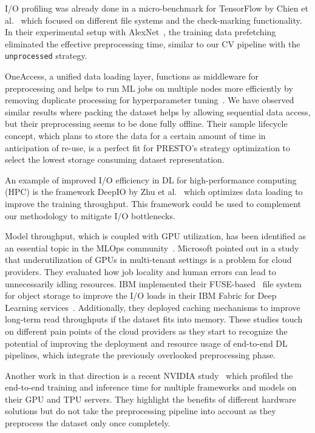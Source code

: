 I/O profiling was already done in a micro-benchmark for TensorFlow by Chien et al.~\cite{Chien_2018} which focused on different file systems and the check-marking functionality.
In their experimental setup with AlexNet~\cite{krizhevsky2012imagenet}, the training data prefetching eliminated the effective preprocessing time, similar to our CV pipeline with the \texttt{unprocessed} strategy.

OneAccess, a unified data loading layer, functions as middleware for preprocessing and helps to run ML jobs on multiple nodes more efficiently by removing duplicate processing for hyperparameter tuning~\cite{kakaraparthy2019case}.
We have observed similar results where packing the dataset helps by allowing sequential data access, but their preprocessing seems to be done fully offline.
Their sample lifecycle concept, which plans to store the data for a certain amount of time in anticipation of re-use, is a perfect fit for PRESTO's strategy optimization to select the lowest storage consuming dataset representation.

An example of improved I/O efficiency in DL for high-performance computing (HPC) is the framework DeepIO by Zhu et al.~\cite{zhu2018entropy} which optimizes data loading to improve the training throughput.
This framework could be used to complement our methodology to mitigate I/O bottlenecks.

Model throughput, which is coupled with GPU utilization, has been identified as an essential topic in the MLOps community~\cite{Jeon2018,ozeri2018object,murray2021tf}.
Microsoft pointed out in a study~\cite{Jeon2018} that underutilization of GPUs in multi-tenant settings is a problem for cloud providers.
They evaluated how job locality and human errors can lead to unnecessarily idling resources.
IBM implemented their FUSE-based~\cite{fuse2018} file system for object storage to improve the I/O loads in their IBM Fabric for Deep Learning services~\cite{ozeri2018object}.
Additionally, they deployed caching mechanisms to improve long-term read throughputs if the dataset fits into memory.
These studies touch on different pain points of the cloud providers as they start to recognize the potential of improving the deployment and resource usage of end-to-end DL pipelines, which integrate the previously overlooked preprocessing phase.

Another work in that direction is a recent NVIDIA study~\cite{nvidiabenchmarks2020} which profiled the end-to-end training and inference time for multiple frameworks and models on their GPU and TPU servers. They highlight the benefits of different hardware solutions but do not take the preprocessing pipeline into account as they preprocess the dataset only once completely.

